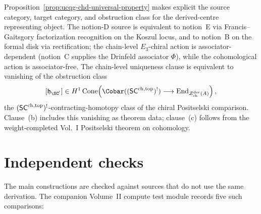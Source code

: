 \begin{remark}
\label{rem:ucqg-chd-scope}%
Proposition~\ref{prop:ucqg-chd-universal-property} makes explicit
the source category, target category, and obstruction class for the
derived-centre representing object. The notion-D source is equivalent
to notion~E via
Francis--Gaitsgory factorization recognition on the Koszul locus,
and to notion~B on the formal disk via rectification; the chain-level
$E_3$-chiral action is associator-dependent (notion~C supplies the
Drinfeld associator $\Phi$), while the cohomological action is
associator-free. The chain-level uniqueness clause is equivalent to
vanishing of the obstruction class
\[
 [\mathfrak h_{\SC^!}]
 \in
 H^1\Cone\!\left(
 \Cobar((\SCchtop)^!)\longrightarrow
 \End_{\cZ^{\mathrm{der}}_{\mathrm{ch}}(A)}
 \right),
\]
the $(\mathsf{SC}^{\mathrm{ch},\mathrm{top}})^!$-contracting-homotopy class of the chiral
Positselski comparison. Clause~(b) includes this vanishing as theorem
data; clause~(c) follows from the weight-completed Vol.~I
Positselski theorem on cohomology.
\end{remark}

\section{Independent checks}
\label{sec:ucqg-independent-verification}

The main constructions are checked against sources that do not use the
same derivation. The companion Volume~II compute test module records
five such comparisons:

